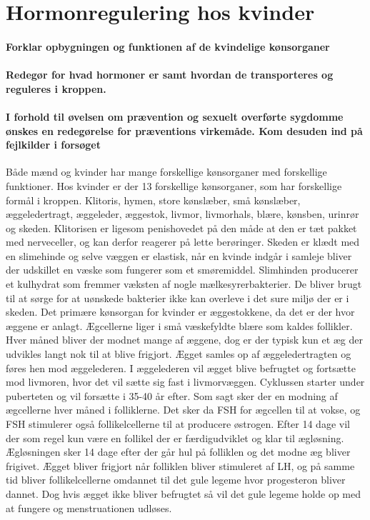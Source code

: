 \newpage
\part{Hormonregulering hos kvinder}
\subsection*{Forklar opbygningen og funktionen af de kvindelige kønsorganer}
\subsection*{Redegør for hvad hormoner er samt hvordan de transporteres og reguleres i kroppen.}
\subsection*{I forhold til øvelsen om prævention og sexuelt overførte sygdomme ønskes en redegørelse for præventions virkemåde. Kom desuden ind på fejlkilder i forsøget}
Både mænd og kvinder har mange forskellige kønsorganer med forskellige funktioner. Hos kvinder er der 13 forskellige kønsorganer, som har forskellige formål i kroppen. Klitoris, hymen, store kønslæber, små kønslæber, æggeledertragt, æggeleder, æggestok, livmor, livmorhals, blære, kønsben, urinrør og skeden. Klitorisen er ligesom penishovedet på den måde at den er tæt pakket med nerveceller, og kan derfor reagerer på lette berøringer. Skeden er klædt med en slimehinde og selve væggen er elastisk, når en kvinde indgår i samleje bliver der udskillet en væske som fungerer som et smøremiddel. Slimhinden producerer et kulhydrat som fremmer væksten af nogle mælkesyrerbakterier. De bliver brugt til at sørge for at uønskede bakterier ikke kan overleve i det sure miljø der er i skeden. Det primære kønsorgan for kvinder er æggestokkene, da det er der hvor æggene er anlagt. Ægcellerne liger i små væskefyldte blære som kaldes follikler. Hver måned bliver der modnet mange af æggene, dog er der typisk kun et æg der udvikles langt nok til at blive frigjort. Ægget samles op af æggeledertragten og føres hen mod æggelederen. I æggelederen vil ægget blive befrugtet og fortsætte mod livmoren, hvor det vil sætte sig fast i livmorvæggen. 
Cyklussen starter under puberteten og vil forsætte i 35-40 år efter. Som sagt sker der en modning af ægcellerne hver måned i folliklerne. Det sker da FSH for ægcellen til at vokse, og FSH stimulerer også follikelcellerne til at producere østrogen. Efter 14 dage vil der som regel kun være en follikel der er færdigudviklet og klar til ægløsning. Ægløsningen sker 14 dage efter der går hul på folliklen og det modne æg bliver frigivet. Ægget bliver frigjort når folliklen bliver stimuleret af LH, og på samme tid bliver follikelcellerne omdannet til det gule legeme hvor progesteron bliver dannet. Dog hvis ægget ikke bliver befrugtet så vil det gule legeme holde op med at fungere og menstruationen udløses.




